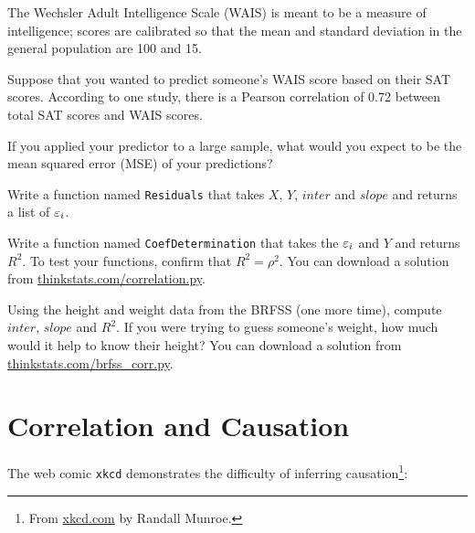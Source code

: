 \documentclass[12pt]{book}
\begin{document}
\begin{exercise}
The Wechsler Adult Intelligence Scale (WAIS) is meant to be a measure
of intelligence; scores are calibrated so that the mean and standard
deviation in the general population are 100 and 15.


Suppose that you wanted to predict someone's WAIS score based on their
SAT scores.  According to one study, there is a Pearson correlation of
0.72 between total SAT scores and WAIS scores.

If you applied your predictor to a large sample, what would you expect to
be the mean squared error (MSE) of your predictions?

\end{exercise}


\begin{exercise}
Write a function named {\tt Residuals} that takes $X$, $Y$, $inter$
and $slope$ and returns a list of $\varepsilon_i$.


Write a function named {\tt CoefDetermination} that takes the $\varepsilon_i$
and $Y$ and returns $R^2$.  To test your functions, confirm that $R^2
= \rho^2$.  You can download a solution
from \url{thinkstats.com/correlation.py}.


\end{exercise}

\begin{exercise}
Using the height and weight data from the BRFSS (one more time),
compute $inter$, $slope$ and $R^2$.  If you were trying to guess
someone's weight, how much would it help to know their height?
You can download a solution from
\url{thinkstats.com/brfss_corr.py}.



\end{exercise}


\section{Correlation and Causation}


The web comic {\tt xkcd} demonstrates the difficulty of inferring
causation\footnote{From \url{xkcd.com} by Randall Munroe.}:
\end{document}
